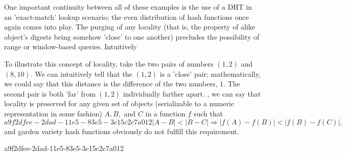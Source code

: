 \documentclass[12pt]{article}
\begin{document}
\par One important continuity between all of these examples is the use of a DHT in an 'exact-match' lookup scenario; the even distribution of hash functions once again comes into play. The purging of any locality (that is, the property of alike object's digests being somehow 'close' to one another) precludes the possibility of range or window-based queries. Intuitively

\par To illustrate this concept of locality, take the two pairs of numbers $(1,2)$ and $(8,10)$. We can intuitively tell that the $(1,2)$ is a 'close' pair; mathematically, we could say that this distance is the difference of the two numbers, $1$. The second pair is both 'far' from $(1,2)$ individually farther apart. , we can say that locality is preserved for any given set of objects (serializable to a numeric representation in some fashion) $A,B,$ and $C$ in a function $f$ such that
\begin{equation}
a9f2dfee-2dad-11e5-83e5-3c15c2c7a012|A-B| < |B-C| \Rightarrow |f(A)-f(B)| < |f(B) - f(C)|,
\end{equation}
and garden variety hash functions obviously do not fulfill this requirement.

\printbibliography
a9f2dfee-2dad-11e5-83e5-3c15c2c7a012
\end{document}
